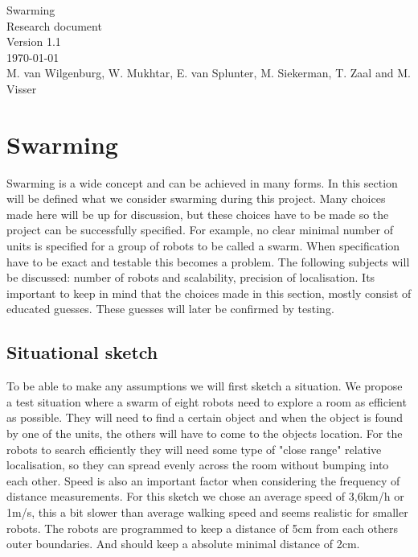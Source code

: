 \documentclass[10pt,a4paper]{article}
\begin{document}
\begin{titlepage}
    \centering
    \vfill
    {\Large

    Swarming\\

   
    {\small Research document}\\
    {\small Version 1.1}\\
    {\small \today}\\
        
        \vskip2cm
        {\small M. van Wilgenburg, W. Mukhtar, E. van Splunter, M. Siekerman, T. Zaal and M. Visser}\\
    }    
    \vfill
    
    \vfill
    \vfill
\end{titlepage}

\newpage

\listoffigures
\newpage

\listoftables
\newpage

\tableofcontents
\newpage

\section{Swarming}
Swarming is a wide concept and can be achieved in many forms. In this section will be defined what we consider swarming during this project. Many choices made here will be up for discussion, but these choices have to be made so the project can be successfully specified. For example, no clear minimal number of units is specified for a group of robots to be called a swarm. When specification have to be exact and testable this becomes a problem. The following subjects will be discussed: number of robots and scalability, precision of localisation. Its important to keep in mind that the choices made in this section, mostly consist of educated guesses. These guesses will later be confirmed by testing.

\subsection{Situational sketch}
To be able to make any assumptions we will first sketch a situation. We propose a test situation where a swarm of eight robots need to explore a room as efficient as possible. They will need to find a certain object and when the object is found by one of the units, the others will have to come to the objects location. For the robots to search efficiently they will need some type of "close range" relative localisation, so they can spread evenly across the room without bumping into each other. Speed is also an important factor when considering the frequency of distance measurements. For this sketch we chose an average speed of 3,6km/h or 1m/s, this a bit slower than average walking speed and seems realistic for smaller robots. The robots are programmed to keep a distance of 5cm from each others outer boundaries. And should keep a absolute minimal distance of 2cm.
\end{document}
